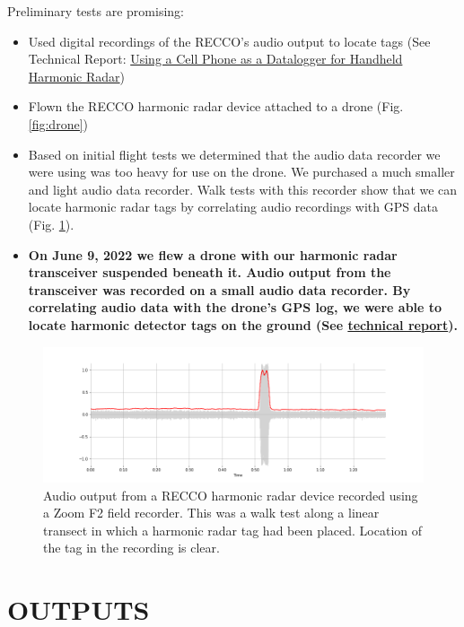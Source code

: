 \documentclass[12pt,letterpaper,english,bibliography=totocnumbered,abstract=on]{scrartcl}
\begin{document}
Preliminary tests are promising:
\begin{itemize}
	\item Used digital recordings of the RECCO's audio output to locate tags (See Technical Report: \href{https://github.com/aubreymoore/Harmonic-Radar/raw/master/experiments/techreport/techreport.pdf}{Using a Cell Phone as a Datalogger for Handheld Harmonic Radar})	
	\item Flown the RECCO harmonic radar device attached to a drone (Fig. \ref{fig:drone})
	\item Based on initial flight tests we determined that the audio data recorder we were using was too heavy for use on the drone. We purchased a much smaller and light audio data recorder. Walk tests with this recorder show that we can locate harmonic radar tags by correlating audio recordings with GPS data (Fig. \ref{fig:211109003}).
	\item \textbf{On June 9, 2022 we flew a drone with our harmonic radar transceiver suspended beneath it. Audio output from the transceiver was recorded on a small audio data recorder. By correlating audio data with the drone's GPS log, we were able to locate harmonic detector tags on the ground (See \href{https://github.com/aubreymoore/Harmonic-Radar/raw/master/experiments/2022-06-09-drone/techreport.pdf}{technical report}).}
\end{itemize}

\begin{figure}[h]
	\centering
	\includegraphics[width=\linewidth]{211109_003.png}
	\caption{Audio output from a RECCO harmonic radar device recorded using a Zoom F2 field recorder. This was a walk test along a linear transect in which a harmonic radar tag had been placed. Location of the tag in the recording is clear.}
	\label{fig:211109003}
\end{figure}

\clearpage

\section{OUTPUTS} 
\end{document}
